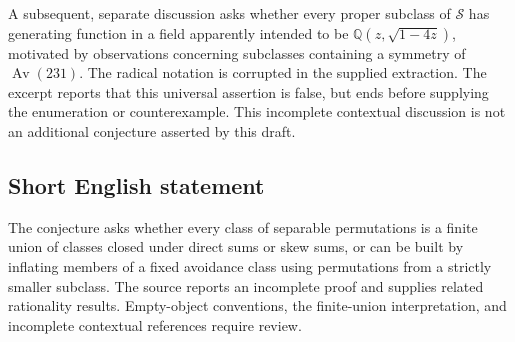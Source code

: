 \documentclass[11pt]{article}
\newcommand{\Q}{\mathbb{Q}}
\begin{document}
A subsequent, separate discussion asks whether every proper subclass of \(\mathcal S\) has generating function in a field apparently intended to be \(\Q(z,\sqrt{1-4z})\), motivated by observations concerning subclasses containing a symmetry of \(\operatorname{Av}(231)\). The radical notation is corrupted in the supplied extraction. The excerpt reports that this universal assertion is false, but ends before supplying the enumeration or counterexample. This incomplete contextual discussion is not an additional conjecture asserted by this draft.
\subsection{Short English statement}
The conjecture asks whether every class of separable permutations is a finite union of classes closed under direct sums or skew sums, or can be built by inflating members of a fixed avoidance class using permutations from a strictly smaller subclass. The source reports an incomplete proof and supplies related rationality results. Empty-object conventions, the finite-union interpretation, and incomplete contextual references require review.
\end{document}
